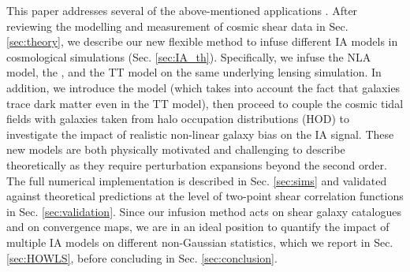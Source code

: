 This paper addresses several of the above-mentioned applications .
After reviewing the modelling and measurement of cosmic shear data in Sec. \ref{sec:theory}, we describe our new flexible method to infuse different IA models in cosmological simulations (Sec. \ref{sec:IA_th}). 
Specifically, we infuse the NLA model, the \dNLA, and the TT model on the same underlying lensing simulation. 
In addition, we introduce the \dTT model (which takes into account the fact that galaxies trace dark matter even in the TT model), then proceed to couple the cosmic tidal fields with galaxies taken from halo occupation distributions (HOD) to investigate the impact of realistic non-linear galaxy bias on the IA signal.
These new models are both physically motivated and challenging to describe theoretically as they require perturbation expansions beyond the second order.  
The full numerical implementation is described in Sec. \ref{sec:sims} and validated against theoretical predictions at the level of  two-point shear correlation functions in Sec. \ref{sec:validation}.
Since our infusion method acts on shear galaxy catalogues and on convergence maps, we are in an ideal position to quantify the impact of multiple IA models on different non-Gaussian statistics, which we report in Sec. \ref{sec:HOWLS}, before concluding in Sec. \ref{sec:conclusion}. 